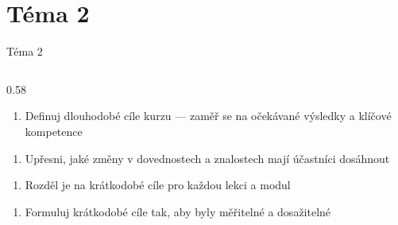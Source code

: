 \documentclass[aspectratio=169]{beamer}
\begin{document}
\section{Téma 2}
\begin{frame}{Téma 2}
\begin{columns}[T,onlytextwidth]
\begin{column}{0.58\textwidth}
\scriptsize
\begin{enumerate}

\def\labelenumi{\arabic{enumi}.}

\tightlist

\item

  Definuj dlouhodobé cíle kurzu --- zaměř se na očekávané výsledky a klíčové kompetence

\end{enumerate}


\begin{enumerate}

\def\labelenumi{\arabic{enumi}.}

\setcounter{enumi}{1}

\tightlist

\item

  Upřesni, jaké změny v dovednostech a znalostech mají účastníci dosáhnout

\end{enumerate}


\begin{enumerate}

\def\labelenumi{\arabic{enumi}.}

\setcounter{enumi}{2}

\tightlist

\item

  Rozděl je na krátkodobé cíle pro každou lekci a modul

\end{enumerate}


\begin{enumerate}

\def\labelenumi{\arabic{enumi}.}

\setcounter{enumi}{3}

\tightlist

\item

  Formuluj krátkodobé cíle tak, aby byly měřitelné a dosažitelné

\end{enumerate}



\end{column}
\end{columns}
\end{frame}
\end{document}
